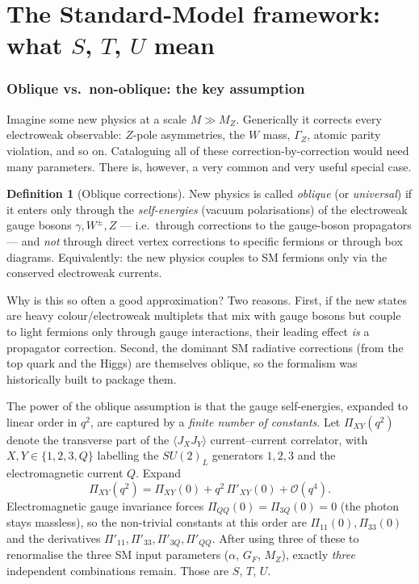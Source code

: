 \documentclass[11pt]{article}
\newcommand{\Pibig}{\Pi}
\newcommand{\SUL}{SU(2)_L}
\theoremstyle{definition}
\newtheorem{definition}{Definition}
\begin{document}
\part{The Standard-Model framework: what $S$, $T$, $U$ mean}
\label{part:sm}

\section{Oblique vs.\ non-oblique: the key assumption}
\label{sec:oblique}

Imagine some new physics at a scale $M \gg M_Z$. Generically it corrects every
electroweak observable: $Z$-pole asymmetries, the $W$ mass, $\Gamma_Z$, atomic
parity violation, and so on. Cataloguing all of these correction-by-correction
would need many parameters. There is, however, a very common and very useful
special case.

\begin{definition}[Oblique corrections]
New physics is called \emph{oblique} (or \emph{universal}) if it enters only
through the \emph{self-energies} (vacuum polarisations) of the electroweak gauge
bosons $\gamma, W^\pm, Z$ --- i.e.\ through corrections to the gauge-boson
propagators --- and \emph{not} through direct vertex corrections to specific
fermions or through box diagrams. Equivalently: the new physics couples to SM
fermions only via the conserved electroweak currents.
\end{definition}

Why is this so often a good approximation? Two reasons. First, if the new
states are heavy colour/electroweak multiplets that mix with gauge bosons but
couple to light fermions only through gauge interactions, their leading effect
\emph{is} a propagator correction. Second, the dominant SM radiative corrections
(from the top quark and the Higgs) are themselves oblique, so the formalism was
historically built to package them.

The power of the oblique assumption is that the gauge self-energies, expanded to
linear order in $q^2$, are captured by a \emph{finite number of constants}. Let
$\Pibig_{XY}(q^2)$ denote the transverse part of the $\langle J_X J_Y\rangle$
current--current correlator, with $X,Y \in \{1,2,3,Q\}$ labelling the $\SUL$
generators $1,2,3$ and the electromagnetic current $Q$. Expand
\begin{equation}
\Pibig_{XY}(q^2) = \Pibig_{XY}(0) + q^2\, \Pibig'_{XY}(0) + \mathcal{O}(q^4).
\label{eq:Piexpand}
\end{equation}
Electromagnetic gauge invariance forces $\Pibig_{QQ}(0)=\Pibig_{3Q}(0)=0$ (the
photon stays massless), so the non-trivial constants at this order are
$\Pibig_{11}(0), \Pibig_{33}(0)$ and the derivatives
$\Pibig'_{11},\Pibig'_{33},\Pibig'_{3Q},\Pibig'_{QQ}$. After using three of
these to renormalise the three SM input parameters
($\alpha$, $G_F$, $M_Z$), exactly \emph{three} independent combinations remain.
Those are $S$, $T$, $U$.
\end{document}
